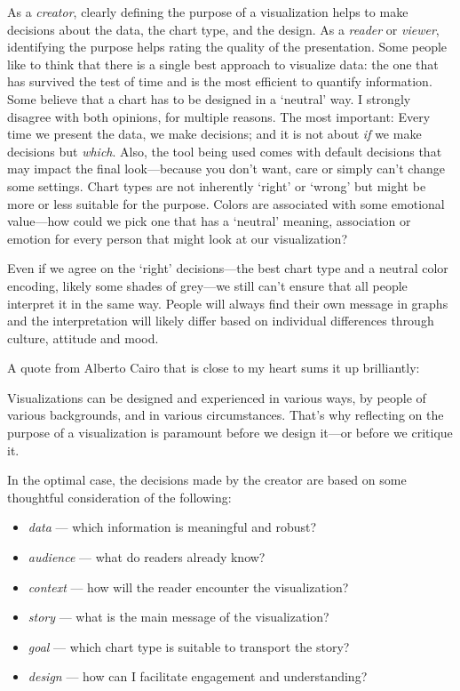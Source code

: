 \documentclass[
]{krantz}
\providecommand{\tightlist}{%
  \setlength{\itemsep}{0pt}\setlength{\parskip}{0pt}}
\renewenvironment{quote}{\begin{VF}}{\end{VF}}
\begin{document}
As a \emph{creator}, clearly defining the purpose of a visualization helps to make decisions about the data, the chart type, and the design. As a \emph{reader} or \emph{viewer}, identifying the purpose helps rating the quality of the presentation. Some people like to think that there is a single best approach to visualize data: the one that has survived the test of time and is the most efficient to quantify information. Some believe that a chart has to be designed in a `neutral' way. I strongly disagree with both opinions, for multiple reasons. The most important: Every time we present the data, we make decisions; and it is not about \emph{if} we make decisions but \emph{which}. Also, the tool being used comes with default decisions that may impact the final look---because you don't want, care or simply can't change some settings. Chart types are not inherently `right' or `wrong' but might be more or less suitable for the purpose. Colors are associated with some emotional value---how could we pick one that has a `neutral' meaning, association or emotion for every person that might look at our visualization?

Even if we agree on the `right' decisions---the best chart type and a neutral color encoding, likely some shades of grey---we still can't ensure that all people interpret it in the same way. People will always find their own message in graphs and the interpretation will likely differ based on individual differences through culture, attitude and mood.

A quote from Alberto Cairo that is close to my heart sums it up brilliantly:

\begin{quote}
Visualizations can be designed and experienced in various ways, by people of various backgrounds, and in various circumstances. That's why reflecting on the purpose of a visualization is paramount before we design it---or before we critique it. \citep{cairo2021}
\end{quote}

In the optimal case, the decisions made by the creator are based on some thoughtful consideration of the following:

\begin{itemize}
\tightlist
\item
  \emph{data} --- which information is meaningful and robust?
\item
  \emph{audience} --- what do readers already know?
\item
  \emph{context} --- how will the reader encounter the visualization?
\item
  \emph{story} --- what is the main message of the visualization?
\item
  \emph{goal} --- which chart type is suitable to transport the story?
\item
  \emph{design} --- how can I facilitate engagement and understanding?
\end{itemize}
\end{document}
